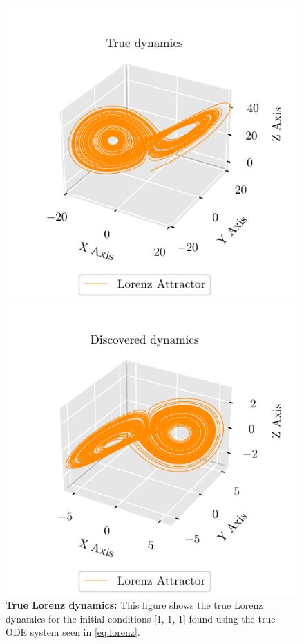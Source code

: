 \begin{figure}[t]
\centering
\begin{minipage}[b]{.45\textwidth}
\centering
\includegraphics[width=\textwidth]{project_2/images/lorenz_true_dynamics.pdf}
\caption{\textbf{True Lorenz dynamics:} This figure shows the true Lorenz dynamics for the initial conditions [1, 1, 1] found using the true ODE system seen in \autoref{eq:lorenz}.}
\label{fig:lorenz_true_dynamics}
\end{minipage}\qquad\quad
\begin{minipage}[b]{.45\textwidth}
\centering
\includegraphics[width=\textwidth]{project_2/images/lorenz_discovered_dynamics.pdf}

\end{minipage}
\end{figure}
